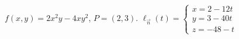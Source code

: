 {$f(x,y) = 2x^2y-4xy^2$,   $P=(2,3)$.\label{12_06_ex_09}
}
{
	$\ell_{\vec n}(t) = \left\{\begin{array}{l} x=2-12t\\ y=3-40t \\ z = -48-t\end{array}\right.$
}